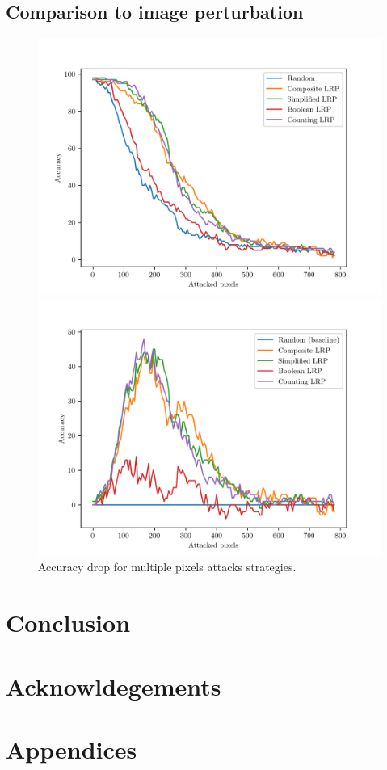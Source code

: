 \documentclass{../cs-classes/cs-classes}
\newcommand*{\1}{\digitsbb{1}}
\newcommand*{\0}{\digitsbb{0}}
\begin{document}
\subsection{Comparison to image perturbation}
\begin{figure}[H]
    \centering
    \begin{minipage}[c]{.49\textwidth}
        \centering
        \includegraphics[width=\textwidth]{attack-graph-1.png}
    \end{minipage}
    \begin{minipage}[c]{.49\textwidth}
        \centering
        \includegraphics[width=\textwidth]{attack-graph-2.png}
    \end{minipage}
    \caption{Accuracy drop for multiple pixels attacks strategies.}
\end{figure}

\section{Conclusion}

\section*{Acknowldegements}

\nocite{*}
\printbibliography

\newpage
\section*{Appendices}
\end{document}

